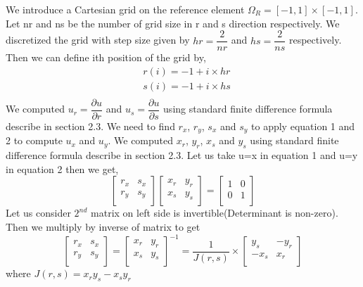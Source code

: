 \documentclass{article}
\begin{document}
We introduce a Cartesian grid on the reference element $\Omega_R = [-1,1]\times [-1,1]$. Let nr and ns be the number of grid size in r and s direction respectively. We discretized the grid with step size given by $hr=\dfrac{2}{nr}$ and $hs=\dfrac{2}{ns}$ respectively. Then we can define ith position of the grid by,
\begin{align*}
   &  r(i) = -1 + i \times hr\\
    & s(i) = -1 + i \times hs\\
\end{align*}
We computed $u_r = \dfrac{\partial u}{\partial r}$ and $u_s = \dfrac{\partial u}{\partial s}$ using standard finite difference formula describe in section 2.3. We need to find $r_x$, $r_y$, $s_x$ and $s_y$ to apply equation 1 and 2 to compute $u_x$ and $u_y$. We computed $x_r$, $y_r$, $x_s$ and $y_s$ using standard finite difference formula describe in section 2.3. Let us take u=x in equation 1 and u=y in equation 2 then we get, 
\begin{equation*}
    \begin{bmatrix}
    r_x & s_x \\
    r_y & s_y \\ 
    \end{bmatrix} 
     \begin{bmatrix}
    x_r & y_r \\
    x_s & y_s \\ 
    \end{bmatrix} 
    = 
    \begin{bmatrix}
        1 & 0 \\
        0 & 1 \\
    \end{bmatrix}
\end{equation*}
Let us consider $2^{nd}$ matrix on left side is invertible(Determinant is non-zero). Then we multiply by inverse of matrix to get 
\begin{equation}
       \begin{bmatrix}
    r_x & s_x \\
    r_y & s_y \\ 
    \end{bmatrix}
    =
     {\begin{bmatrix}
    x_r & y_r \\
    x_s & y_s \\ 
    \end{bmatrix}}^{-1}
    = 
   \frac{1}{J(r,s)} \times
     \begin{bmatrix}
    y_s & -y_r \\
    -x_s & x_r \\ 
    \end{bmatrix} 
\end{equation}
where $J(r,s) = x_ry_s - x_sy_r $
\end{document}
